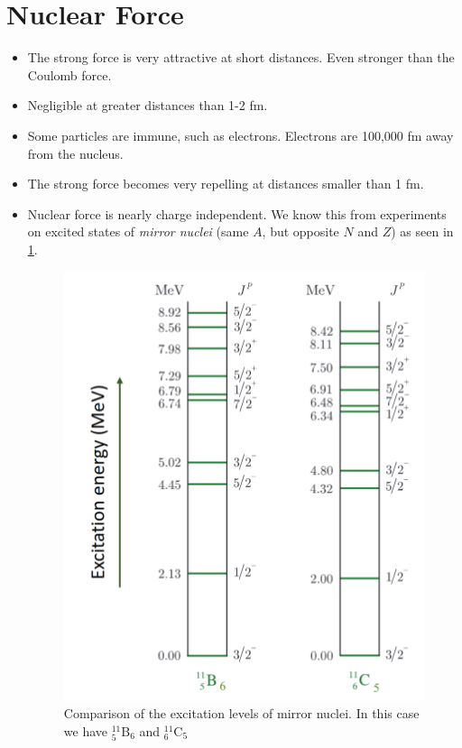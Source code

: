 \section{Nuclear Force}
\begin{itemize}
    \item The strong force is very attractive at short distances. Even stronger than the Coulomb force. 
    \item Negligible at greater distances than 1-2 fm. 
    \item Some particles are immune, such as electrons. Electrons are 100,000 fm away from the nucleus.  
    \item The strong force becomes very repelling at distances smaller than 1 fm. 
    \item Nuclear force is nearly charge independent. We know this from experiments on excited states of \textit{mirror nuclei} (same $A$, but opposite $N$ and $Z$) as seen in \cref{fig: mirror_nuclei_excitation_levels_comparison}.
    \begin{figure}[h!]
    \centering
    \includegraphics[width = .5\textwidth]{mirror_nuclei_excitation_levels_comparison.png}
    \caption{Comparison of the excitation levels of mirror nuclei. In this case we have $\displaystyle _{5}^{11}\text{B}_{6}$ and $\displaystyle _{6}^{11}\text{C}_{5}$}
    \label{fig: mirror_nuclei_excitation_levels_comparison}
    \end{figure} 
    
\end{itemize}

